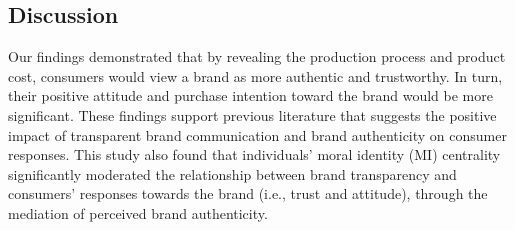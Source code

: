 \documentclass[a0,portrait]{a0poster}
\begin{document}
\begin{minipage}[c]{\linewidth}
\begin{framed}
\begin{multicols}{2}
\section*{Discussion}
\color{Black}
Our findings demonstrated that by revealing the production process and product cost, consumers would view a brand as more authentic and trustworthy. In turn, their positive attitude and purchase intention toward the brand would be more significant. These findings support previous literature that suggests the positive impact of transparent brand communication and brand authenticity on consumer responses. This study also found that individuals’ moral identity (MI) centrality significantly
moderated the relationship between brand transparency and consumers’ responses towards the brand (i.e., trust and attitude), through the mediation of perceived brand authenticity.


\color{Maroon} \\
\color{Black}
\printbibliography
\end{multicols}
\vspace{0.5cm}
\end{framed}
\end{minipage}
\end{document}
